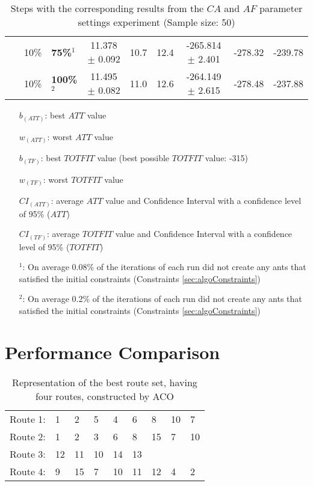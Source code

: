 \begin{sidewaystable}
\begin{tabular}{|l|l|l||c|c|c|c|c|c|}
    ~ & 10\% &\textbf{75\%$^1$} & 11.378 $\pm$ 0.092 & 10.7 & 12.4 & -265.814 $\pm$ 2.401 & -278.32 & -239.78 \\
    ~ & 10\% &\textbf{100\%$^2$} & 11.495 $\pm$ 0.082 & 11.0 & 12.6 & -264.149 $\pm$ 2.615 & -278.48 & -237.88 \\
    \hline
    \end{tabular}
    \caption {Steps with the corresponding results from the $CA$ and $AF$ parameter settings experiment (Sample size: 50)}
    \tiny
    \begin{itemize}[noitemsep]
    \item[$b_{(ATT)}$:] best $ATT$ value
    \item[$w_{(ATT)}$:] worst $ATT$ value
    \item[$b_{(TF)}$:] best $TOTFIT$ value (best possible $TOTFIT$ value: -315)
    \item[$w_{(TF)}$:] worst $TOTFIT$ value
    \item[$CI_{(ATT)}$:] average $ATT$ value and Confidence Interval with a confidence level of 95\% ($ATT$)
    \item[$CI_{(TF)}$:] average $TOTFIT$ value and Confidence Interval with a confidence level of 95\% ($TOTFIT$)
    \item[$^1$:] On average 0.08\% of the iterations of each run did not create any ants that satisfied the initial constraints (Constraints \vref{sec:algoConstraints})
    \item[$^2$:] On average 0.2\% of the iterations of each run did not create any ants that satisfied the initial constraints (Constraints \vref{sec:algoConstraints})
    \end{itemize}
    \label{table:pm2}
\end{sidewaystable}


\section{Performance Comparison}

\begin{table}[H]
    \centering
    \begin{tabular}{|l|llllllll|}
    \hline
    Route 1: & 1 & 2 & 5 & 4 & 6 & 8 & 10 & 7 \\
    Route 2: & 1 & 2 & 3 & 6 & 8 & 15 & 7 & 10 \\
    Route 3: & 12 & 11 & 10 & 14 & 13 &  &  & \\
    Route 4: & 9 & 15 & 7 & 10 & 11 & 12 & 4 & 2 \\
    \hline
    \end{tabular}
    \caption {Representation of the best route set, having four routes, constructed by ACO}
    \label{table:performanceComparison_bestRouteSet4_ACO}
\end{table}

